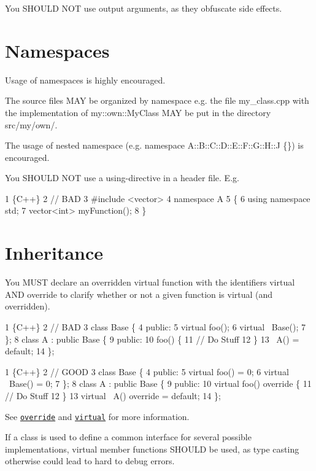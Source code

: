 You S\+H\+O\+U\+LD N\+OT use output arguments, as they obfuscate side effects.

\section*{Namespaces}

Usage of namespaces is highly encouraged.

The source files M\+AY be organized by namespace e.\+g. the file {\ttfamily my\+\_\+class.\+cpp} with the implementation of {\ttfamily my\+::own\+::\+My\+Class} M\+AY be put in the directory {\ttfamily src/my/own/}.

The usage of nested namespace (e.\+g. {\ttfamily namespace A\+::\+B\+::\+C\+::\+D\+::\+E\+::\+F\+::\+G\+::\+H\+::J \{\}}) is encouraged.

You S\+H\+O\+U\+LD N\+OT use a using-\/directive in a header file. E.\+g. 
\begin{DoxyCode}
1 \{C++\}
2 // BAD
3 #include <vector>
4 namespace A
5 \{
6     using namespace std;
7     vector<int> myFunction();
8 \}
\end{DoxyCode}


\section*{Inheritance}

You M\+U\+ST declare an overridden virtual function with the identifiers {\ttfamily virtual} A\+ND {\ttfamily override} to clarify whether or not a given function is virtual (and overridden). 
\begin{DoxyCode}
1 \{C++\}
2 // BAD
3 class Base \{
4     public:
5     virtual foo();
6     virtual ~Base();
7 \};
8 class A : public Base \{
9     public:
10     foo() \{
11         // Do Stuff
12     \}
13     ~A() = default;
14 \};
\end{DoxyCode}
 
\begin{DoxyCode}
1 \{C++\}
2 // GOOD
3 class Base \{
4     public:
5     virtual foo() = 0;
6     virtual ~Base() = 0;
7 \};
8 class A : public Base \{
9     public:
10     virtual foo() override \{
11         // Do Stuff
12     \}
13     virtual ~A() override = default;
14 \};
\end{DoxyCode}
 See \href{https://en.cppreference.com/w/cpp/language/override}{\tt override} and \href{https://en.cppreference.com/w/cpp/language/virtual}{\tt virtual} for more information.

If a class is used to define a common interface for several possible implementations, virtual member functions S\+H\+O\+U\+LD be used, as type casting otherwise could lead to hard to debug errors.

